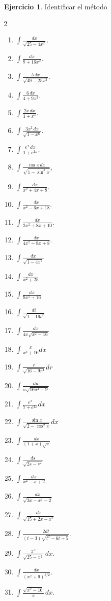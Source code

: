 \documentclass[12pt]{article}
\theoremstyle{definition}
\newtheorem{Ejer}[teorema]{Ejercicio}
\theoremstyle{remark}
\begin{document}
\begin{Ejer}{Identificar el método}
\begin{multicols}{2}
\begin{enumerate}[resume=integrales]
\item $\displaystyle \int\frac{dx}{\sqrt{25-4x^2}}$.
\item $\displaystyle \int\frac{dx}{9+16x^2}$.
\item $\displaystyle \int\frac{5\,dx}{\sqrt{49-25x^2}}$.
\item $\displaystyle \int\frac{6\,dx}{4+9x^2}$.
\item $\displaystyle \int\frac{2x\,dx}{1+x^4}$.
\item $\displaystyle \int\frac{3x^2\,dx}{\sqrt{1-x^6}}$.
\item $\displaystyle \int\frac{e^x\,dx}{1+e^{2x}}$.
\item $\displaystyle \int\frac{\cos x\,dx}{\sqrt{1-\sin^2x}}$,
\item $\displaystyle \int\frac{dx}{x^2+4x+8}$.
\item $\displaystyle \int\frac{dx}{x^2-6x+18}$.
\item $\displaystyle \int\frac{dx}{2x^2+8x+10}$.
\item $\displaystyle \int\frac{dx}{4x^2-8x+8}$.
\item $\int\frac{dx}{\sqrt{1-4x^2}}$ 
\item $\int\frac{dx}{x^2+25}$ 
\item $\int\frac{dx}{9x^2+16}$ 
\item $\int\frac{dt}{\sqrt{1-16t^2}}$
\item $\int\frac{dx}{4x\sqrt{x^2-16}}$
 \item $\int\frac{x}{x^4+16}dx$ 
 \item $\int\frac{r}{\sqrt{16-9r^4}}dr$ 
 \item $\int\frac{du}{u\sqrt{16u^2-9}}$
\item $\int\frac{e^x}{7+e^{2x}}dx$ 
\item $\int\frac{\sin x}{\sqrt{2-\cos^2x}}dx$ 
\item $\int\frac{dx}{(1+x)\sqrt x}$ 
\item $\int\frac{ds}{\sqrt{2s-s^2}}$
\item $\int\frac{dx}{x^2-x+2}$ 
\item $\int\frac{dx}{\sqrt{3x-x^2-2}}$ 
\item $\int\frac{dx}{\sqrt{15+2x-x^2}}$ 
\item $\int\frac{2dt}{(t-3)\sqrt{t^2-6t+5}}$.
\item $\displaystyle \int\frac{x^2}{\sqrt{25-x^2}}\,dx$.
\item $\displaystyle \int\frac{dx}{(x^2+9)^{3/2}}$.
\item $\displaystyle \int\frac{\sqrt{x^2-16}}{x}\,dx$.

\end{enumerate}
\end{multicols}
\end{Ejer}
\end{document}
